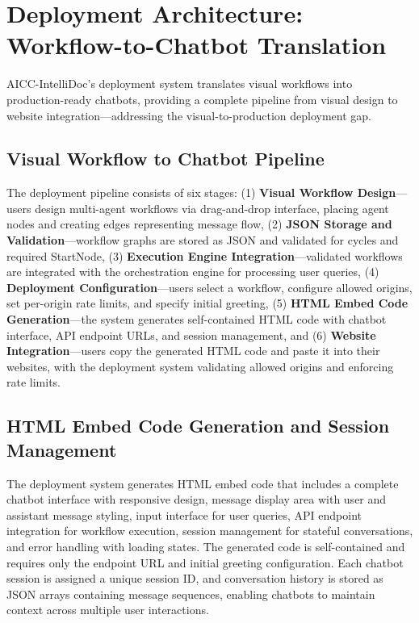 \documentclass[11pt]{article}
\begin{document}
\section{Deployment Architecture: Workflow-to-Chatbot Translation}

AICC-IntelliDoc's deployment system translates visual workflows into production-ready chatbots, providing a complete pipeline from visual design to website integration—addressing the visual-to-production deployment gap.

\subsection{Visual Workflow to Chatbot Pipeline}

The deployment pipeline consists of six stages: (1) \textbf{Visual Workflow Design}—users design multi-agent workflows via drag-and-drop interface, placing agent nodes and creating edges representing message flow, (2) \textbf{JSON Storage and Validation}—workflow graphs are stored as JSON and validated for cycles and required StartNode, (3) \textbf{Execution Engine Integration}—validated workflows are integrated with the orchestration engine for processing user queries, (4) \textbf{Deployment Configuration}—users select a workflow, configure allowed origins, set per-origin rate limits, and specify initial greeting, (5) \textbf{HTML Embed Code Generation}—the system generates self-contained HTML code with chatbot interface, API endpoint URLs, and session management, and (6) \textbf{Website Integration}—users copy the generated HTML code and paste it into their websites, with the deployment system validating allowed origins and enforcing rate limits.

\subsection{HTML Embed Code Generation and Session Management}

The deployment system generates HTML embed code that includes a complete chatbot interface with responsive design, message display area with user and assistant message styling, input interface for user queries, API endpoint integration for workflow execution, session management for stateful conversations, and error handling with loading states. The generated code is self-contained and requires only the endpoint URL and initial greeting configuration. Each chatbot session is assigned a unique session ID, and conversation history is stored as JSON arrays containing message sequences, enabling chatbots to maintain context across multiple user interactions.
\end{document}
